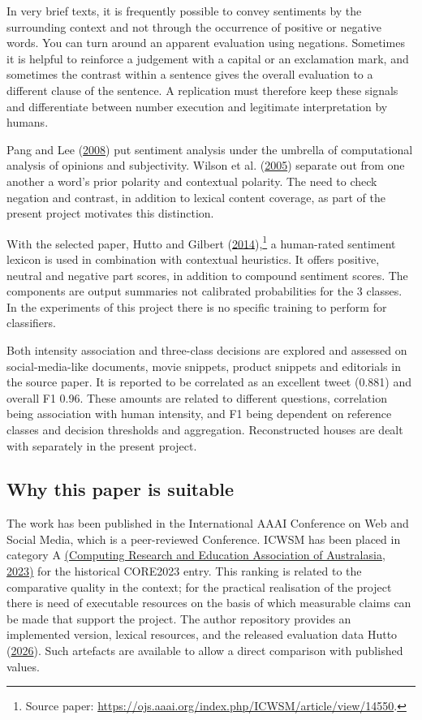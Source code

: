 \documentclass[11pt]{article}
\begin{document}
In very brief texts, it is frequently possible to convey sentiments by the surrounding context and not through the occurrence of positive or negative words. You can turn around an apparent evaluation using negations. Sometimes it is helpful to reinforce a judgement with a capital or an exclamation mark, and sometimes the contrast within a sentence gives the overall evaluation to a different clause of the sentence. A replication must therefore keep these signals and differentiate between number execution and legitimate interpretation by humans.


Pang and Lee (\hyperlink{ref_pang2008opinion}{2008}) put sentiment analysis under the umbrella of computational analysis of opinions and subjectivity. Wilson et al. (\hyperlink{ref_wilson2005contextual}{2005}) separate out from one another a word's prior polarity and contextual polarity. The need to check negation and contrast, in addition to lexical content coverage, as part of the present project motivates this distinction.


With the selected paper, Hutto and Gilbert (\hyperlink{ref_hutto2014vader}{2014}),\footnote{Source paper: \url{https://ojs.aaai.org/index.php/ICWSM/article/view/14550}.} a human-rated sentiment lexicon is used in combination with contextual heuristics. It offers positive, neutral and negative part scores, in addition to compound sentiment scores. The components are output summaries not calibrated probabilities for the 3 classes. In the experiments of this project there is no specific training to perform for classifiers.


Both intensity association and three-class decisions are explored and assessed on social-media-like documents, movie snippets, product snippets and editorials in the source paper. It is reported to be correlated as an excellent tweet (0.881) and overall F1 0.96. These amounts are related to different questions, correlation being association with human intensity, and F1 being dependent on reference classes and decision thresholds and aggregation. Reconstructed houses are dealt with separately in the present project.


\subsection{Why this paper is suitable}

The work has been published in the International AAAI Conference on Web and Social Media, which is a peer-reviewed Conference. ICWSM has been placed in category A \hyperlink{ref_core2023}{(Computing Research and Education Association of Australasia, 2023)} for the historical CORE2023 entry. This ranking is related to the comparative quality in the context; for the practical realisation of the project there is need of executable resources on the basis of which measurable claims can be made that support the project. The author repository provides an implemented version, lexical resources, and the released evaluation data Hutto (\hyperlink{ref_huttoCode}{2026}). Such artefacts are available to allow a direct comparison with published values.
\end{document}
